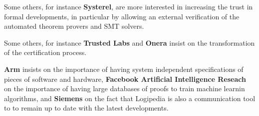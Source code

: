 Some
others, for instance {\bf Systerel}, are more interested in 
increasing the trust in formal developments, in particular by allowing
an external verification of the automated theorem provers and SMT
solvers.

Some others, for instance {\bf Trusted Labs} and {\bf Onera} insist
on the transformation of the certification process.

{\bf Arm} insists
on the importance of having system independent specifications of
pieces of software and hardware,   {\bf Facebook Artificial
  Intelligence Reseach} on the importance of having large
databases of proofs to train machine learnin algorithms, and  {\bf
  Siemens} on the fact that Logipedia is also a communication tool to
to remain up to date with the latest developments.

\newcommand\couic[1]{}

